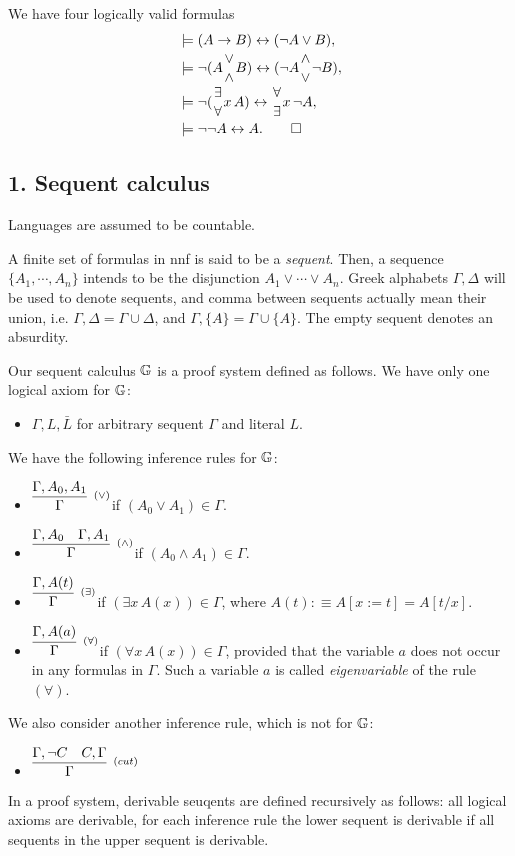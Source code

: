 \documentclass{../../small}
\begin{document}
\begin{pf}
We have four logically valid formulas
\begin{align*}
&\models(A\to B)\leftrightarrow(\neg A\vee B),\\
&\models\neg(A{\vee\atop\wedge}B)\leftrightarrow(\neg A{\wedge\atop\vee}\neg B),\\
&\models\neg({\exists\atop\forall}x\,A)\leftrightarrow{\forall\atop\exists}x\,\neg A,\\
&\models\neg\neg A\leftrightarrow A.\qedhere
\end{align*}
\end{pf}

\subsection*{1. Sequent calculus}
\setcounter{section}{1}

Languages are assumed to be countable.
\begin{defn}
A finite set of formulas in nnf is said to be a \emph{sequent}. %
Then, a sequence $\{A_1,\cdots,A_n\}$ intends to be the disjunction $A_1\vee\cdots\vee A_n$.
Greek alphabets $\Gamma,\Delta$ will be used to denote sequents, and comma between sequents actually mean their union, i.e. $\Gamma,\Delta=\Gamma\cup\Delta$, and $\Gamma,\{A\}=\Gamma\cup\{A\}$.
The empty sequent denotes an absurdity.
\end{defn}

\begin{defn}
Our sequent calculus $\mathbb{G}$ is a proof system defined as follows.
We have only one logical axiom for $\mathbb{G}$:
\begin{itemize}
\item $\Gamma,L,\bar{L}$ for arbitrary sequent $\Gamma$ and literal $L$.
\end{itemize}
We have the following inference rules for $\mathbb{G}$:
\begin{itemize}
\item \qquad$\infer[^{(\vee)}]{\Gamma}{\Gamma,A_0,A_1}$\qquad if $(A_0\vee A_1)\in\Gamma$.
\item \qquad$\infer[^{(\wedge)}]{\Gamma}{\Gamma,A_0 & \Gamma,A_1}$\qquad if $(A_0\wedge A_1)\in\Gamma$.
\item \qquad$\infer[^{(\exists)}]{\Gamma}{\Gamma,A(t)}$\qquad if $(\exists x\,A(x))\in\Gamma$, where $A(t):\equiv A[x:=t]=A[t/x]$.
\item \qquad$\infer[^{(\forall)}]{\Gamma}{\Gamma,A(a)}$\qquad if $(\forall x\,A(x))\in\Gamma$, provided that the variable $a$ does not occur in any formulas in $\Gamma$. Such a variable $a$ is called \emph{eigenvariable} of the rule $(\forall)$.
\end{itemize}
We also consider another inference rule, which is not for $\mathbb{G}$:
\begin{itemize}
\item \qquad$\infer[^{(cut)}]{\Gamma}{\Gamma,\neg C & C,\Gamma}$\qquad
\end{itemize}
In a proof system, derivable seuqents are defined recursively as follows: all logical axioms are derivable, for each inference rule the lower sequent is derivable if all sequents in the upper sequent is derivable.
\end{defn}
\end{document}
